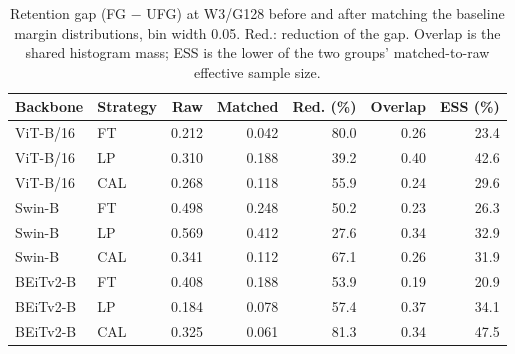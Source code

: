 \begin{table}[t]
\centering
\caption{Retention gap (FG $-$ UFG) at W3/G128 before and after matching the baseline margin distributions, bin width 0.05. Red.: reduction of the gap. Overlap is the shared histogram mass; ESS is the lower of the two groups' matched-to-raw effective sample size.}
\label{tab:margin}
\setlength{\tabcolsep}{1.6pt}
\small
\begin{tabular}{llrrrrr}
\toprule
Backbone & Strategy & Raw & Matched & Red. (\%) & Overlap & ESS (\%) \\
\midrule
ViT-B/16 & FT & 0.212 & 0.042 & 80.0 & 0.26 & 23.4 \\
ViT-B/16 & LP & 0.310 & 0.188 & 39.2 & 0.40 & 42.6 \\
ViT-B/16 & CAL & 0.268 & 0.118 & 55.9 & 0.24 & 29.6 \\
Swin-B & FT & 0.498 & 0.248 & 50.2 & 0.23 & 26.3 \\
Swin-B & LP & 0.569 & 0.412 & 27.6 & 0.34 & 32.9 \\
Swin-B & CAL & 0.341 & 0.112 & 67.1 & 0.26 & 31.9 \\
BEiTv2-B & FT & 0.408 & 0.188 & 53.9 & 0.19 & 20.9 \\
BEiTv2-B & LP & 0.184 & 0.078 & 57.4 & 0.37 & 34.1 \\
BEiTv2-B & CAL & 0.325 & 0.061 & 81.3 & 0.34 & 47.5 \\
\bottomrule
\end{tabular}
\end{table}
